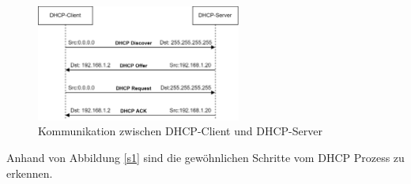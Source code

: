 \documentclass[fontsize=12pt,paper=a4,open=any,parskip=half,
  twoside=false,toc=listof,toc=bibliography,fleqn,leqno,
  captions=nooneline,captions=tableabove,british]{scrbook}
\begin{document}
\begin{figure}
	\vspace{-\baselineskip}
	\centering
	\includegraphics[width=0.6\textwidth]{Bilder/dhcpablauf}
	\caption{Kommunikation zwischen DHCP-Client und DHCP-Server}
	\label{dhcp3}
\end{figure}

Anhand von Abbildung \ref{s1} sind die gewöhnlichen Schritte vom DHCP Prozess zu erkennen.  
\end{document}
